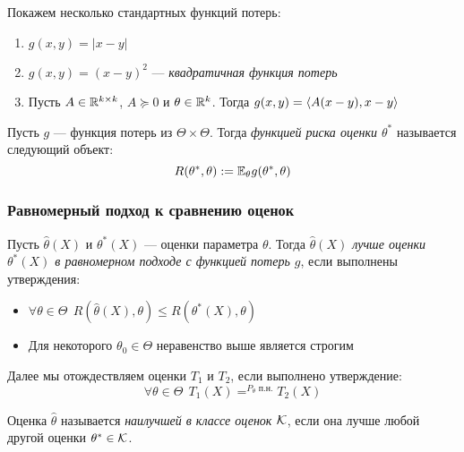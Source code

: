 \begin{example}
	Покажем несколько стандартных функций потерь:
	\begin{enumerate}
		\item $g(x, y) = |x - y|$
		
		\item $g(x, y) = (x - y)^2$ --- \textit{квадратичная функция потерь}
		
		\item Пусть $A \in \mathbb{R}^{k \times k}$, $A \succeq 0$ и $\theta \in \mathbb{R}^k$. Тогда $g(x, y) = \left\langle A(x - y), x - y\right\rangle$
	\end{enumerate}
\end{example}

\begin{definition}
	Пусть $g$ --- функция потерь из $\Theta \times \Theta$. Тогда \textit{функцией риска оценки $\theta^*$} называется следующий объект:
	\[
		R(\theta^*, \theta) := \mathbb{E}_\theta g(\theta^*, \theta)
	\]
\end{definition}

\subsubsection{Равномерный подход к сравнению оценок}

\begin{definition}
	Пусть $\hat{\theta}(X)$ и $\theta^*(X)$ --- оценки параметра $\theta$. Тогда \textit{$\hat{\theta}(X)$ лучше оценки $\theta^*(X)$ в равномерном подходе с функцией потерь $g$}, если выполнены утверждения:
	\begin{itemize}
		\item $\forall \theta \in \Theta\ \ R(\hat{\theta}(X), \theta) \le R(\theta^*(X), \theta)$
		
		\item Для некоторого $\theta_0 \in \Theta$ неравенство выше является строгим
	\end{itemize}
\end{definition}

\begin{note}
	Далее мы отождествляем оценки $T_1$ и $T_2$, если выполнено утверждение:
	\[
		\forall \theta \in \Theta\ \ T_1(X) =^{P_{\theta}\text{ п.н.}} T_2(X)
	\]
\end{note}

\begin{definition}
	Оценка $\hat{\theta}$ называется \textit{наилучшей в классе оценок $\mathcal{K}$}, если она лучше любой другой оценки $\theta^* \in \mathcal{K}$.
\end{definition}

